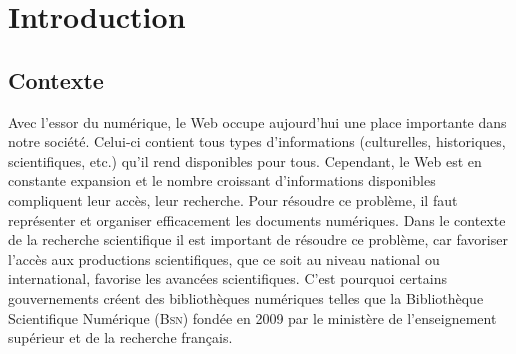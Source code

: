 \chapter{Introduction }
\label{chap:main-introduction}


  \section{Contexte}
  \label{sec:main-introduction-context}
    Avec l'essor du numérique, le Web occupe aujourd'hui une place importante
    dans notre société. Celui-ci contient tous types d'informations
    (culturelles, historiques, scientifiques, etc.) qu'il rend disponibles
    pour tous. Cependant, le Web est en constante expansion et le nombre
    croissant d'informations disponibles compliquent leur accès, leur
    recherche. Pour résoudre ce problème, il faut représenter et organiser
    efficacement les documents numériques. Dans le contexte de la recherche
    scientifique il est important de résoudre ce problème, car favoriser
    l'accès aux productions scientifiques, que ce soit au niveau national ou
    international, favorise les avancées scientifiques. C'est pourquoi
    certains gouvernements créent des bibliothèques numériques telles que la
    Bibliothèque Scientifique Numérique (\textsc{Bsn}) fondée en 2009 par le
    ministère de l'enseignement supérieur et de la recherche français.

